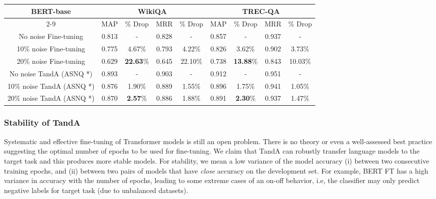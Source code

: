 \documentclass[letterpaper]{article} \usepackage{aaai20}  \usepackage{times}  \usepackage{helvet} \usepackage{courier}  \usepackage[hyphens]{url}  \usepackage{graphicx} \urlstyle{rm} \def\UrlFont{\rm}  \usepackage{graphicx}  \usepackage{todonotes}
\newcommand{\TANDA}{T{\sc and}A}
\begin{document}
\begin{table*}[t]
\begin{small}
\center
\begin{tabular}{|c|c|c|c|c|c|c|c|c|}
\hline
\multirow{2}{*}{\textbf{BERT-base}} & \multicolumn{4}{c|}{WikiQA}       & \multicolumn{4}{c|}{TREC-QA}       \\ \cline{2-9} 
                       & MAP   & \% Drop & MRR   & \% Drop & MAP   & \% Drop & MRR   & \% Drop \\ \hline
No noise Fine-tuning   & 0.813 & -       & 0.828 & -       & 0.857 & -       & 0.937 & -       \\ \hline
10\% noise Fine-tuning & 0.775 & 4.67\%  & 0.793 & 4.22\%  & 0.826 & 3.62\%  & 0.902 & 3.73\%  \\ \hline
20\% noise Fine-tuning & 0.629 & \textbf{22.63}\% & 0.645 & 22.10\% & 0.738 & \textbf{13.88}\% & 0.843 & 10.03\% \\ \hline
No noise  {\TANDA} (ASNQ   *)         & 0.893 & -       & 0.903 & -       & 0.912 & -       & 0.951 & -       \\ \hline
10\% noise  {\TANDA} (ASNQ   *)       & 0.876 & 1.90\%  & 0.889 & 1.55\%  & 0.896 & 1.75\%  & 0.941 & 1.05\%  \\ \hline
20\% noise  {\TANDA} (ASNQ   *)        & 0.870 & \textbf{2.57}\%  & 0.886 & 1.88\%  & 0.891 & \textbf{2.30}\%  & 0.937 & 1.47\%  \\ \hline
\end{tabular}
\caption{Model accuracy when noise is injected into WikiQA and TREC-QA datasets.  indicates the target dataset for the second step of fine-tuning (adapt step).}
\label{Table:Noise_Wiki_Trec_description}
\end{small}
\vspace{-1em}
\end{table*}

\subsubsection{Stability of  {\TANDA}}
Systematic and effective fine-tuning of Transformer models is still an open problem. There is no theory or even a well-assessed best practice suggesting the optimal number of epochs to be used for fine-tuning. We claim that {\TANDA} can robustly transfer language models to the target task and this produces more stable models. For stability, we mean a low variance of the model accuracy (i) between two consecutive training epochs, and (ii) between two pairs of models that have \emph{close} accuracy on the development set. For example, BERT FT has a high variance in accuracy with the number of epochs, leading to some extreme cases of an on-off behavior, i.e, the classifier may only predict negative labels for target task (due to unbalanced datasets).
\end{document}
